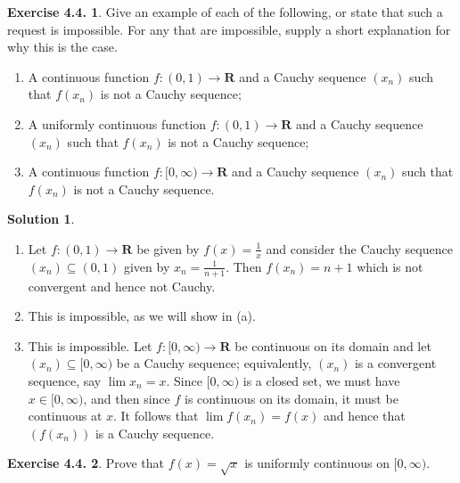 \documentclass[12pt]{article}
\theoremstyle{definition}
\theoremstyle{exercise}
\newtheorem{exercise}{Exercise 4.4.}
\theoremstyle{solution}
\newtheorem*{solution}{Solution}
\newcommand{\R}{\mathbf{R}}
\begin{document}
\begin{exercise}
\label{ex:6}
    Give an example of each of the following, or state that such a request is impossible. For any that are impossible, supply a short explanation for why this is the case.
    \begin{enumerate}
        \item A continuous function \( f : (0, 1) \to \R \) and a Cauchy sequence \( (x_n) \) such that \( f(x_n) \) is not a Cauchy sequence;

        \item A uniformly continuous function \( f : (0, 1) \to \R \) and a Cauchy sequence \( (x_n) \) such that \( f(x_n) \) is not a Cauchy sequence;

        \item A continuous function \( f : [0, \infty) \to \R \) and a Cauchy sequence \( (x_n) \) such that \( f(x_n) \) is not a Cauchy sequence.
    \end{enumerate}
\end{exercise}

\begin{solution}
    \begin{enumerate}
        \item Let \( f : (0, 1) \to \R \) be given by \( f(x) = \tfrac{1}{x} \) and consider the Cauchy sequence \( (x_n) \subseteq (0, 1) \) given by \( x_n = \tfrac{1}{n+1} \). Then \( f(x_n) = n + 1 \) which is not convergent and hence not Cauchy.

        \item This is impossible, as we will show in  (a).

        \item This is impossible. Let \( f : [0, \infty) \to \R \) be continuous on its domain and let \( (x_n) \subseteq [0, \infty) \) be a Cauchy sequence; equivalently, \( (x_n) \) is a convergent sequence, say \( \lim x_n = x \). Since \( [0, \infty) \) is a closed set, we must have \( x \in [0, \infty) \), and then since \( f \) is continuous on its domain, it must be continuous at \( x \). It follows that \( \lim f(x_n) = f(x) \) and hence that \( (f(x_n)) \) is a Cauchy sequence.
    \end{enumerate}
\end{solution}

\begin{exercise}
\label{ex:7}
    Prove that \( f(x) = \sqrt{x} \) is uniformly continuous on \( [0, \infty) \).
\end{exercise}
\end{document}
